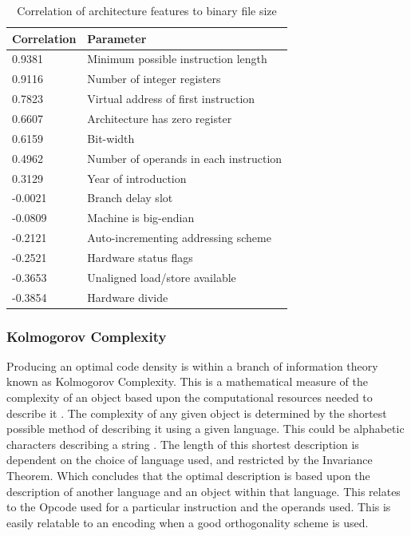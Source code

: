 \documentclass[12pt,a4paper]{article}
\begin{document}
\begin{table}[htb]
	\centering
	\footnotesize
	\begin{tabular}{|p{2.5cm}|l|}
	\hline \textbf{Correlation} & \textbf{Parameter} \\ \hline
	0.9381 & Minimum possible instruction length \\
	0.9116 & Number of integer registers \\ 
	0.7823 & Virtual address of first instruction \\
	0.6607 & Architecture has zero register \\
	0.6159 & Bit-width \\
	0.4962 & Number of operands in each instruction \\
	0.3129 & Year of introduction \\ \hline 
	-0.0021 & Branch delay slot \\
	-0.0809 & Machine is big-endian \\
	-0.2121 & Auto-incrementing addressing scheme \\
	-0.2521 & Hardware status flags \\
	-0.3653 & Unaligned load/store available \\
	-0.3854 & Hardware divide \\ \hline
	\end{tabular}
	\caption{\label{tab:Correlation}Correlation of architecture features to binary file size \cite{Density:Correlation}}
\end{table}

\subsubsection{Kolmogorov Complexity}
Producing an optimal code density is within a branch of information theory known as Kolmogorov Complexity. This is a mathematical measure of the complexity of an object based upon the computational resources needed to describe it \cite{Density:Kolmo}. The complexity of any given object is determined by the shortest possible method of describing it using a given language. This could be alphabetic characters describing a string \cite{Density:Kolmo}. The length of this shortest description is dependent on the choice of language used, and restricted by the Invariance Theorem. Which concludes that the optimal description is based upon the description of another language and an object within that language. This relates to the Opcode used for a particular instruction and the operands used. This is easily relatable to an encoding when a good orthogonality scheme is used. 
\end{document}
